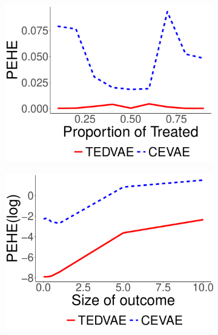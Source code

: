 \documentclass[letterpaper]{article} %
\begin{document}
\begin{figure}[!t]
	\centering
	\begin{subfigure}{0.15\textwidth}
		\includegraphics[width=\linewidth]{synthetic2_alpha.pdf}
	\end{subfigure}
	\begin{subfigure}{0.15\textwidth}
		\includegraphics[width=\linewidth]{synthetic2_beta.pdf}
	\end{subfigure}
	\begin{subfigure}{0.15\textwidth}

\end{subfigure}
\end{figure}
\end{document}
